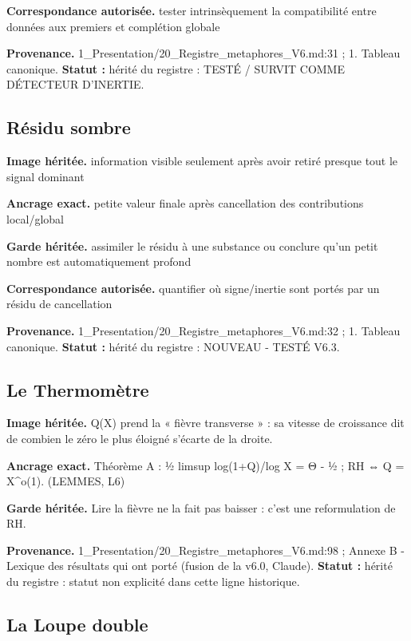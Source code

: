 \documentclass[
  9pt,
  a4paper,
]{article}
\begin{document}
\textbf{Correspondance autorisée.} tester intrinsèquement la
compatibilité entre données aux premiers et complétion globale

\textbf{Provenance.} 1\_Presentation/20\_Registre\_metaphores\_V6.md:31
; 1. Tableau canonique. \textbf{Statut :} hérité du registre : TESTÉ /
SURVIT COMME DÉTECTEUR D'INERTIE.

\hypertarget{ruxe9sidu-sombre}{%
\subsection{Résidu sombre}\label{ruxe9sidu-sombre}}

\textbf{Image héritée.} information visible seulement après avoir retiré
presque tout le signal dominant

\textbf{Ancrage exact.} petite valeur finale après cancellation des
contributions local/global

\textbf{Garde héritée.} assimiler le résidu à une substance ou conclure
qu'un petit nombre est automatiquement profond

\textbf{Correspondance autorisée.} quantifier où signe/inertie sont
portés par un résidu de cancellation

\textbf{Provenance.} 1\_Presentation/20\_Registre\_metaphores\_V6.md:32
; 1. Tableau canonique. \textbf{Statut :} hérité du registre : NOUVEAU -
TESTÉ V6.3.

\hypertarget{le-thermomuxe8tre}{%
\subsection{Le Thermomètre}\label{le-thermomuxe8tre}}

\textbf{Image héritée.} Q(X) prend la « fièvre transverse » : sa vitesse
de croissance dit de combien le zéro le plus éloigné s'écarte de la
droite.

\textbf{Ancrage exact.} Théorème A : ½ limsup log(1+Q)/log X = Θ - ½ ;
RH ⇔ Q = X\^{}o(1). (LEMMES, L6)

\textbf{Garde héritée.} Lire la fièvre ne la fait pas baisser : c'est
une reformulation de RH.

\textbf{Provenance.} 1\_Presentation/20\_Registre\_metaphores\_V6.md:98
; Annexe B - Lexique des résultats qui ont porté (fusion de la v6.0,
Claude). \textbf{Statut :} hérité du registre : statut non explicité
dans cette ligne historique.

\hypertarget{la-loupe-double}{%
\subsection{La Loupe double}\label{la-loupe-double}}
\end{document}

